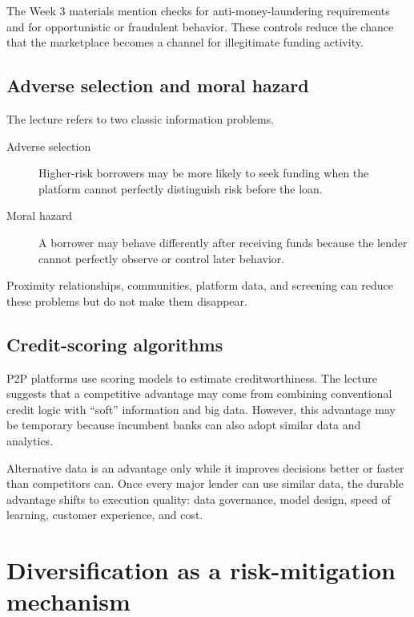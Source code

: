 The Week 3 materials mention checks for anti-money-laundering requirements and for opportunistic or fraudulent behavior. These controls reduce the chance that the marketplace becomes a channel for illegitimate funding activity.

\subsection{Adverse selection and moral hazard}

The lecture refers to two classic information problems.

\begin{description}
  \item[Adverse selection] Higher-risk borrowers may be more likely to seek funding when the platform cannot perfectly distinguish risk before the loan.
  \item[Moral hazard] A borrower may behave differently after receiving funds because the lender cannot perfectly observe or control later behavior.
\end{description}

Proximity relationships, communities, platform data, and screening can reduce these problems but do not make them disappear.

\subsection{Credit-scoring algorithms}

P2P platforms use scoring models to estimate creditworthiness. The lecture suggests that a competitive advantage may come from combining conventional credit logic with ``soft'' information and big data. However, this advantage may be temporary because incumbent banks can also adopt similar data and analytics.

\begin{intuition}
Alternative data is an advantage only while it improves decisions better or faster than competitors can. Once every major lender can use similar data, the durable advantage shifts to execution quality: data governance, model design, speed of learning, customer experience, and cost.
\end{intuition}

\section{Diversification as a risk-mitigation mechanism}

